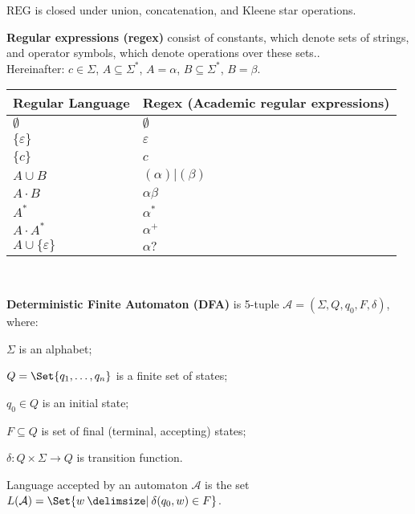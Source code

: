 \documentclass[a4paper,10pt]{article}
\begin{document}
\begin{terms}
    \item $\mathrm{REG}$ is closed under union, concatenation, and Kleene star operations.

    \item \textbf{Regular expressions (regex)} consist of constants, which denote sets of strings, and operator symbols, which denote operations over these sets..\\
    Hereinafter: $c \in \Sigma$, $A \subseteq \Sigma^*$, $A = \alpha$,  $B \subseteq \Sigma^*$, $B = \beta$.\\
     \begin{tabular}{ l l }
         \toprule
         Regular Language & Regex (Academic regular expressions) \\ \hline
         $\emptyset$ & $\emptyset$ \\
         $\{\varepsilon\}$ & $\varepsilon$ \\
         $\{c\}$ & $c$ \\
         $A \cup B$ & $(\alpha)|(\beta)$\\
         $A \cdot B$ & $\alpha\beta$\\
         $A^*$ & $\alpha^*$\\
         $A\cdot A^*$ & $\alpha^+$\\
         $A \cup \{\varepsilon\}$ & $\alpha?$\\
     \end{tabular}
    \\
    \item \textbf{Deterministic Finite Automaton (DFA)} is 5-tuple $\mathcal{A} = (\Sigma, Q, q_0, F, \delta)$, where:

    \begin{terms}
        \item $\Sigma$ is an alphabet;
        \item $Q = \Set{q_1, \dots, q_n}$ is a finite set of states;
        \item $q_0 \in Q$ is an initial state;
        \item $F \subseteq Q$ is set of final (terminal, accepting) states;
        \item $\delta \colon Q \times \Sigma \to Q$ is transition function.
    \end{terms}

    \item Language accepted by an automaton $\mathcal{A}$ is the set $L(\mathcal{A}) = \Set{w \given \delta(q_0, w) \in F}$.


\end{terms}
\end{document}
